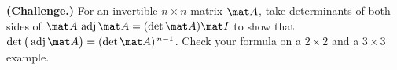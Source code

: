 \begin{exercise}\label{ch22:ex-proof-detadj}
\textbf{(Challenge.)} For an invertible $n\times n$ matrix $\mat A$, take determinants of both sides
of $\mat A\,\operatorname{adj}\mat A=(\det\mat A)\mat I$ to show that
$\det\big(\operatorname{adj}\mat A\big)=(\det\mat A)^{\,n-1}$. Check your formula on a $2\times2$ and a
$3\times3$ example.
\end{exercise}

